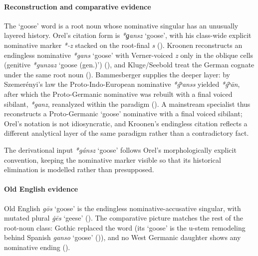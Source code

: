 \documentclass[
  british,
  a4paper,
]{article}
\providecommand{\Recon}[1]{\emph{*#1}}
\begin{document}
\paragraph{Reconstruction and comparative
evidence}\label{reconstruction-and-comparative-evidence-29}

The `goose' word is a root noun whose nominative singular has an
unusually layered history. Orel's citation form is \emph{*ǥansz}
`goose', with his class-wide explicit nominative marker \emph{*-z}
stacked on the root-final \emph{s} (). Kroonen reconstructs an endingless nominative {\emph{*gans}}
`goose' with Verner-voiced \emph{z} only in the oblique cells (genitive
{\emph{*gunzaz}} `goose (gen.)') (), and Kluge/Seebold treat the German cognate under the
same root noun ().
Bammesberger supplies the deeper layer: by Szemerényi's law the
Proto-Indo-European nominative \emph{*ǵʰanss} yielded \emph{*ǵʰān},
after which the Proto-Germanic nominative was rebuilt with a final
voiced sibilant, \emph{*ganz}, reanalyzed within the paradigm
(). A mainstream
specialist thus reconstructs a Proto-Germanic `goose' nominative with a
final voiced sibilant; Orel's notation is not idiosyncratic, and
Kroonen's endingless citation reflects a different analytical layer of
the same paradigm rather than a contradictory fact.

The derivational input \Recon{gánsz} `goose' follows Orel's
morphologically explicit convention, keeping the nominative marker
visible so that its historical elimination is modelled rather than
presupposed.

\paragraph{Old English evidence}\label{old-english-evidence-29}

Old English {\emph{gōs}} `goose' is the endingless nominative-accusative
singular, with mutated plural \emph{ġēs} `geese'
(). The comparative picture
matches the rest of the root-noun class: Gothic replaced the word (its
`goose' is the u-stem remodeling behind Spanish \emph{ganso} `goose'
()), and no West Germanic
daughter shows any nominative ending
().
\end{document}
